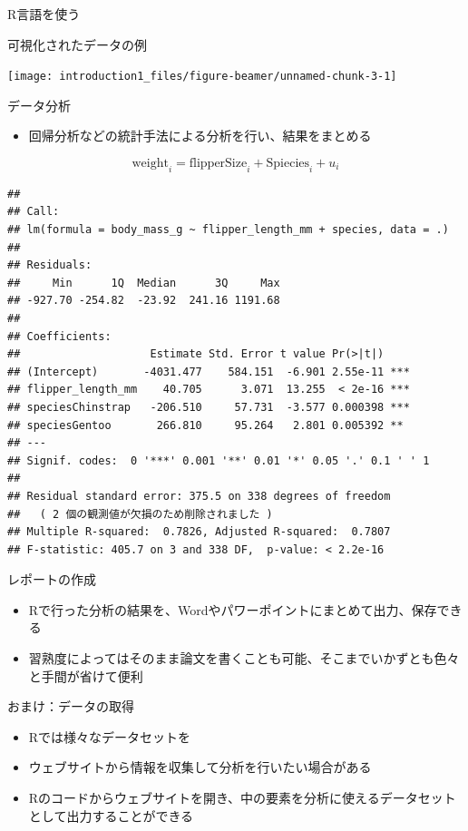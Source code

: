 \documentclass[
  ignorenonframetext,
]{beamer}
\providecommand{\tightlist}{%
  \setlength{\itemsep}{0pt}\setlength{\parskip}{0pt}}
\begin{document}
\begin{frame}[fragile]{R言語を使う}
\begin{block}{可視化されたデータの例}
\begin{center}\texttt{[image: introduction1\_files/figure-beamer/unnamed-chunk-3-1]} \end{center}
\end{block}

\begin{block}{データ分析}
\protect\hypertarget{ux30c7ux30fcux30bfux5206ux6790}{}
\begin{itemize}
\tightlist
\item
  回帰分析などの統計手法による分析を行い、結果をまとめる
\end{itemize}

\[\text{weight}_{i} = \text{flipperSize}_i + \text{Spiecies}_i + u_i\]

\begin{verbatim}
## 
## Call:
## lm(formula = body_mass_g ~ flipper_length_mm + species, data = .)
## 
## Residuals:
##     Min      1Q  Median      3Q     Max 
## -927.70 -254.82  -23.92  241.16 1191.68 
## 
## Coefficients:
##                    Estimate Std. Error t value Pr(>|t|)    
## (Intercept)       -4031.477    584.151  -6.901 2.55e-11 ***
## flipper_length_mm    40.705      3.071  13.255  < 2e-16 ***
## speciesChinstrap   -206.510     57.731  -3.577 0.000398 ***
## speciesGentoo       266.810     95.264   2.801 0.005392 ** 
## ---
## Signif. codes:  0 '***' 0.001 '**' 0.01 '*' 0.05 '.' 0.1 ' ' 1
## 
## Residual standard error: 375.5 on 338 degrees of freedom
##   ( 2 個の観測値が欠損のため削除されました )
## Multiple R-squared:  0.7826, Adjusted R-squared:  0.7807 
## F-statistic: 405.7 on 3 and 338 DF,  p-value: < 2.2e-16
\end{verbatim}
\end{block}

\begin{block}{レポートの作成}
\protect\hypertarget{ux30ecux30ddux30fcux30c8ux306eux4f5cux6210}{}
\begin{itemize}
\tightlist
\item
  Rで行った分析の結果を、Wordやパワーポイントにまとめて出力、保存できる
\item
  習熟度によってはそのまま論文を書くことも可能、そこまでいかずとも色々と手間が省けて便利
\end{itemize}
\end{block}

\begin{block}{おまけ：データの取得}
\protect\hypertarget{ux304aux307eux3051ux30c7ux30fcux30bfux306eux53d6ux5f97}{}
\begin{itemize}
\tightlist
\item
  Rでは様々なデータセットを
\item
  ウェブサイトから情報を収集して分析を行いたい場合がある
\item
  Rのコードからウェブサイトを開き、中の要素を分析に使えるデータセットとして出力することができる
\end{itemize}
\end{block}


\end{frame}
\end{document}

